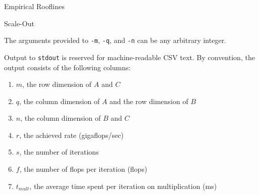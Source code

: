 \documentclass{article}
\begin{document}
\begin{section}{Empirical Rooflines}
\begin{subsection}{Scale-Out}
    \begin{paragraph}{}
      The arguments provided to \texttt{-m}, \texttt{-q}, and \texttt{-n} can be any arbitrary integer.
    \end{paragraph}
    \begin{paragraph}{}
      Output to \texttt{stdout} is reserved for machine-readable CSV text. By convention, the output consists of the following columns:
      \begin{enumerate}
      \item{$m$, the row dimension of $A$ and $C$}
      \item{$q$, the column dimension of $A$ and the row dimension of $B$}
      \item{$n$, the column dimension of $B$ and $C$}
      \item{$r$, the achieved rate (gigaflops/sec)}
      \item{$s$, the number of iterations}
      \item{$f$, the number of flops per iteration (flops)}
      \item{$t_{mult}$, the average time spent per iteration on multiplication (ms)}
      \end{enumerate}
    \end{paragraph}
  \end{subsection}
\end{section}
\end{document}
